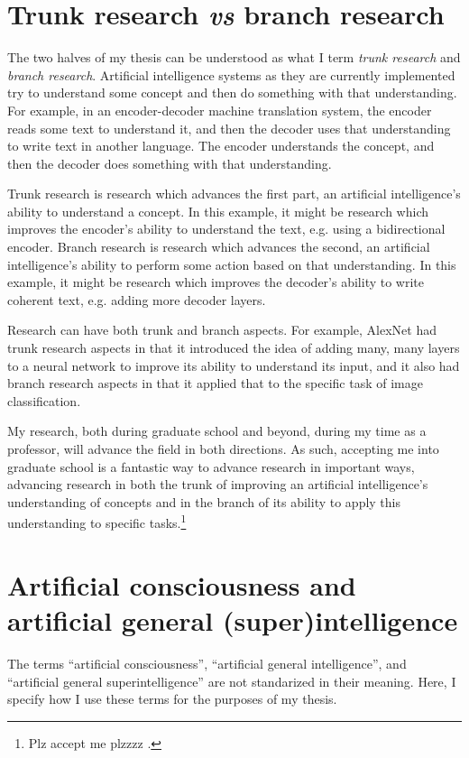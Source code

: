 \documentclass[12pt]{report}
\begin{document}
\section{Trunk research \textit{vs} branch research}
The two halves of my thesis can be understood as what I term \textit{trunk research} and \textit{branch research}.
Artificial intelligence systems as they are currently implemented try to understand some concept and then do something with that understanding.
For example, in an encoder-decoder machine translation system, the encoder reads some text to understand it, and then the decoder uses that understanding to write text in another language.
The encoder understands the concept, and then the decoder does something with that understanding.

Trunk research is research which advances the first part, an artificial intelligence's ability to understand a concept.
In this example, it might be research which improves the encoder's ability to understand the text, e.g. using a bidirectional encoder.
Branch research is research which advances the second, an artificial intelligence's ability to perform some action based on that understanding.
In this example, it might be research which improves the decoder's ability to write coherent text, e.g. adding more decoder layers.

Research can have both trunk and branch aspects.
For example, AlexNet \cite{Krizhevsky2012-qe} had trunk research aspects in that it introduced the idea of adding many, many layers to a neural network to improve its ability to understand its input, and it also had branch research aspects in that it applied that to the specific task of image classification.

My research, both during graduate school and beyond, during my time as a professor, will advance the field in both directions.
As such, accepting me into graduate school is a fantastic way to advance research in important ways, advancing research in both the trunk of improving an artificial intelligence's understanding of concepts and in the branch of its ability to apply this understanding to specific tasks.\footnote{Plz accept me plzzzz .}

\section{Artificial consciousness and artificial general (super)intelligence}

The terms \enquote{artificial consciousness}, \enquote{artificial general intelligence}, and \enquote{artificial general superintelligence} are not standarized in their meaning.
Here, I specify how I use these terms for the purposes of my thesis.
\end{document}
